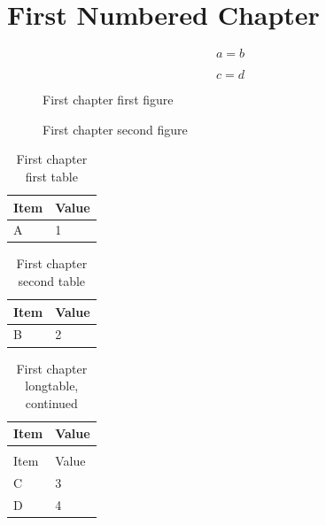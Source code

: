\documentclass{ndsudisq}
\begin{document}
\makefrontmatter
\mainmattersetup

\chapter{First Numbered Chapter}

\begin{equation}
  a = b
\end{equation}

\begin{equation}
  c = d
\end{equation}

\begin{figure}[htbp]
  \centering
  \fbox{\rule{0pt}{0.5in}\rule{1.2in}{0pt}}
  \caption{First chapter first figure}
\end{figure}

\begin{figure}[htbp]
  \centering
  \fbox{\rule{0pt}{0.5in}\rule{1.2in}{0pt}}
  \caption{First chapter second figure}
\end{figure}

\begin{table}[htbp]
  \centering
  \caption{First chapter first table}
  \begin{tabular}{ll}
    \toprule
    Item & Value \\
    \midrule
    A & 1 \\
    \bottomrule
  \end{tabular}
\end{table}

\begin{table}[htbp]
  \centering
  \caption{First chapter second table}
  \begin{tabular}{ll}
    \toprule
    Item & Value \\
    \midrule
    B & 2 \\
    \bottomrule
  \end{tabular}
\end{table}

\begin{longtable}{ll}
\caption{First chapter longtable}\label{tab:counter-longtable}\\
\toprule
Item & Value \\
\midrule
\endfirsthead
\caption[]{First chapter longtable, continued}\\
\toprule
Item & Value \\
\midrule
\endhead
\bottomrule
\endlastfoot
C & 3 \\
D & 4 \\
\end{longtable}
\end{document}
